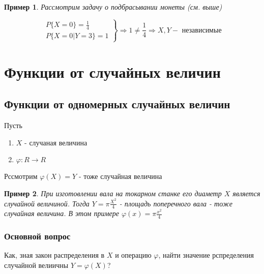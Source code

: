 \documentclass[a4paper, 14pt]{report}
\newtheorem{example}{Пример}[section]
\begin{document}
\begin{example}
    Рассмотрим задачу о подбрасывании монеты (см. выше)

    $$
    \left.
    \begin{matrix}
        P\{X=0\} = \frac{1}{4} \\
        P\{X=0|Y=3\} = 1
    \end{matrix}
    \right\}
    \Rightarrow 1 \ne \frac{1}{4} \Rightarrow X,Y - \text{ независимые}
    $$
\end{example}

\section{Функции от случайных величин}

\subsection{Функции от одномерных случайных величин}

Пусть

\begin{enumerate}
    \item $X$ - случаная величина
    \item $\varphi : R \to R$
\end{enumerate}

Рссмотрим $\varphi(X) = Y$ - тоже случайная величина

\begin{example}
    При изготовлении вала на токарном станке его диаметр $X$ является случайной величиной. Тогда $Y = \pi \frac{X^2}{4}$ - площадь поперечного вала - тоже случайная величина. В этом примере $\varphi(x) = \pi \frac{x^2}{4}$
\end{example}

\subsubsection{Основной вопрос}

Как, зная закон распределения в $X$ и операцию $\varphi$, найти значение рспределения случайной велиичны $Y=\varphi(X)$?
\end{document}
